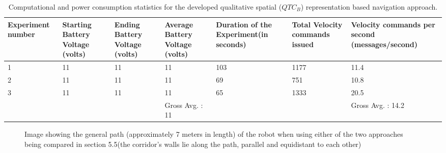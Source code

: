 \begin{table}[h!]
	\begin{adjustwidth}{-1cm}{}
	\begin{tabular}{|p{2cm}|p{2cm}|p{2cm}|p{2.5cm}|p{2cm}|p{2cm}|p{2.5cm}|}
		\hline
		Experiment number & Starting Battery Voltage (volts) & Ending Battery Voltage (volts) & Average Battery Voltage (volts) & Duration of the Experiment(in seconds) & Total Velocity commands issued & Velocity commands per second (messages/second) \\ \hline
		1 & 11 & 11 & 11 & 103 & 1177 & 11.4 \\ \hline
		2 & 11 & 11 & 11 & 69 & 751 & 10.8 \\ \hline
		3 & 11 & 11 & 11 & 65 & 1333 & 20.5 \\ \hline
		&  &  & Gross Avg. : 11 &  &  & Gross Avg. : 14.2 \\ \hline
	\end{tabular}
	\caption{Computational and power consumption statistics for the developed qualitative spatial ($QTC_B$) representation based navigation approach.}
	\label{qualitative table}
\end{adjustwidth}
\end{table}
\newpage
\begin{figure}[H]
	\qquad
	\caption{Image showing the general path (approximately 7 meters in length) of the robot when using either of the two approaches being compared in section 5.5(the corridor's walls lie along the path, parallel and equidistant to each other)}%
	\label{fig:path}%
\end{figure}

